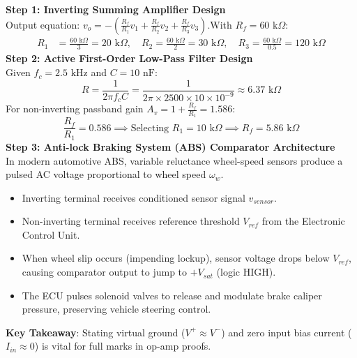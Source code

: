\begin{solbox}
\textbf{Step 1: Inverting Summing Amplifier Design}\\Output equation: $v_o = -\left( \frac{R_f}{R_1}v_1 + \frac{R_f}{R_2}v_2 + \frac{R_f}{R_3}v_3 \right)$.With $R_f = 60\text{ k}\Omega$:\begin{align*}R_1 &= \frac{60\text{ k}\Omega}{3} = 20\text{ k}\Omega, \quad R_2 = \frac{60\text{ k}\Omega}{2} = 30\text{ k}\Omega, \quad R_3 = \frac{60\text{ k}\Omega}{0.5} = 120\text{ k}\Omega\end{align*}\textbf{Step 2: Active First-Order Low-Pass Filter Design}\\Given $f_c = 2.5\text{ kHz}$ and $C = 10\text{ nF}$:\[ R = \frac{1}{2\pi f_c C} = \frac{1}{2\pi \times 2500 \times 10 \times 10^{-9}} \approx 6.37\text{ k}\Omega \]For non-inverting passband gain $A_v = 1 + \frac{R_f}{R_1} = 1.586$:\[ \frac{R_f}{R_1} = 0.586 \implies \text{Selecting } R_1 = 10\text{ k}\Omega \implies R_f = 5.86\text{ k}\Omega \]\textbf{Step 3: Anti-lock Braking System (ABS) Comparator Architecture}\\In modern automotive ABS, variable reluctance wheel-speed sensors produce a pulsed AC voltage proportional to wheel speed $\omega_w$.\begin{itemize}[leftmargin=1.5em]\item Inverting terminal receives conditioned sensor signal $v_{sensor}$.\item Non-inverting terminal receives reference threshold $V_{ref}$ from the Electronic Control Unit.\item When wheel slip occurs (impending lockup), sensor voltage drops below $V_{ref}$, causing comparator output to jump to $+V_{sat}$ (logic HIGH).\item The ECU pulses solenoid valves to release and modulate brake caliper pressure, preserving vehicle steering control.\end{itemize}
\end{solbox}

\begin{examinertip}
\textbf{Key Takeaway}: Stating virtual ground ($V^+ \approx V^-$) and zero input bias current ($I_{in} \approx 0$) is vital for full marks in op-amp proofs.
\end{examinertip}
\vspace{4mm}
